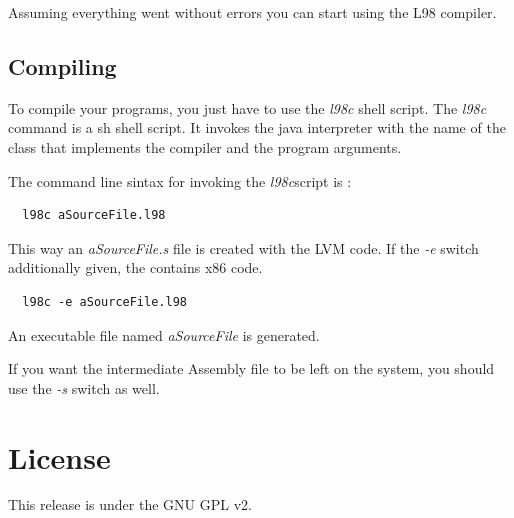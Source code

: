 \documentclass[a4paper, 11pt]{report}
\newcommand{\switch}[1]{\textsl{#1}}
\begin{document}
  Assuming everything went without errors you can start using the L98 compiler.

\section{Compiling}
  To compile your programs, you just have to use the \emph{l98c} shell script.
The \emph{l98c} command is a sh shell script. It invokes the java interpreter
with the name of the class that implements the compiler and the program arguments.

The command line sintax for invoking the \emph{l98c}script is :

\begin{verbatim}
  l98c aSourceFile.l98
\end{verbatim}

This way an \emph{aSourceFile.s} file is created with the LVM code. If the
\switch{-e} switch additionally given, the contains x86 code.

\begin{verbatim}
  l98c -e aSourceFile.l98
\end{verbatim}

An executable file named \emph{aSourceFile} is generated.

If you want the intermediate Assembly file to be left on the system, you should
use the \switch{-s} switch as well.


\chapter{License}

 This release is under the GNU GPL v2.


\begin{thebibliography}{1}
\end{thebibliography}
\end{document}
